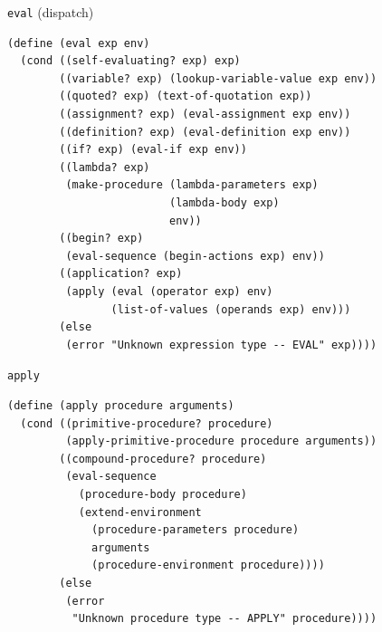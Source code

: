 \documentclass[presentation, bigger]{beamer}
\begin{document}
\begin{frame}[fragile,label={sec:org05cf57d}]{\texttt{eval} (dispatch)}
\begin{lstlisting}
(define (eval exp env)
  (cond ((self-evaluating? exp) exp)
        ((variable? exp) (lookup-variable-value exp env))
        ((quoted? exp) (text-of-quotation exp))
        ((assignment? exp) (eval-assignment exp env))
        ((definition? exp) (eval-definition exp env))
        ((if? exp) (eval-if exp env))
        ((lambda? exp)
         (make-procedure (lambda-parameters exp)
                         (lambda-body exp)
                         env))
        ((begin? exp)
         (eval-sequence (begin-actions exp) env))
        ((application? exp)
         (apply (eval (operator exp) env)
                (list-of-values (operands exp) env)))
        (else
         (error "Unknown expression type -- EVAL" exp))))
\end{lstlisting}
\end{frame}
\begin{frame}[fragile,label={sec:org5a135bf}]{\texttt{apply}}
\begin{lstlisting}
(define (apply procedure arguments)
  (cond ((primitive-procedure? procedure)
         (apply-primitive-procedure procedure arguments))
        ((compound-procedure? procedure)
         (eval-sequence
           (procedure-body procedure)
           (extend-environment
             (procedure-parameters procedure)
             arguments
             (procedure-environment procedure))))
        (else
         (error
          "Unknown procedure type -- APPLY" procedure))))
\end{lstlisting}
\end{frame}
\end{document}
